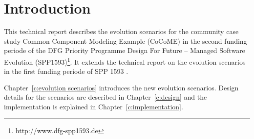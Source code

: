 
\chapter{Introduction}

This technical report describes the evolution scenarios for the community case study Common Component Modeling Example (CoCoME) \cite{herold2008, heinrich2015platform} in the second funding periode of the DFG Priority Programme
Design For Future -- Managed Software Evolution (SPP1593)\footnote{http://www.dfg-spp1593.de}. 
It extends the technical report on the evolution scenarios in the first funding periode of SPP 1593 \cite{HeinrichRostamiReussner2016_1000052688}.

Chapter~\ref{c:evolution scenarios} introduces the new evolution scenarios.
Design details for the scenarios are described in Chapter~\ref{c:design} and the implementation is explained in Chapter~\ref{c:implementation}. 

